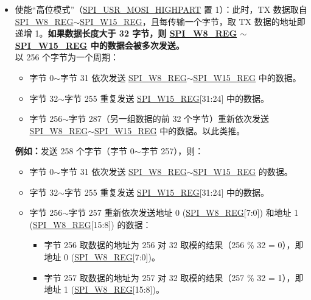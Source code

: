 \documentclass[main\_\_CN.tex]{subfiles}
\begin{document}
\begin{itemize}
\begin{itemize}
\begin{itemize}
        \end{itemize}
        \item 使能“高位模式”（\hyperref[fielddesc:SPIUSRMOSIHIGHPART]{SPI\_USR\_MOSI\_HIGHPART} 置 1）：此时，TX 数据取自 \hyperref[regdesc:SPIW8REG]{SPI\_W8\_REG}$\sim$\hyperref[regdesc:SPIW15REG]{SPI\_W15\_REG}，且每传输一个字节，取 TX 数据的地址即递增 1。\textbf{如果数据长度大于 32 字节，则 \hyperref[regdesc:SPIW8REG]{SPI\_W8\_REG} $\sim$ \hyperref[regdesc:SPIW15REG]{SPI\_W15\_REG} 中的数据会被多次发送。}\\
        以 256 个字节为一个周期：
        \begin{itemize}
            \item 字节 0$\sim$字节 31 依次发送 \hyperref[regdesc:SPIW8REG]{SPI\_W8\_REG}$\sim$\hyperref[regdesc:SPIW15REG]{SPI\_W15\_REG} 中的数据。
            \item 字节 32$\sim$字节 255 重复发送 \hyperref[regdesc:SPIW15REG]{SPI\_W15\_REG}[31:24] 中的数据。
            \item 字节 256$\sim$字节 287（另一组数据的前 32 个字节）重新依次发送 \hyperref[regdesc:SPIW8REG]{SPI\_W8\_REG}$\sim$\hyperref[regdesc:SPIW15REG]{SPI\_W15\_REG} 中的数据。以此类推。
        \end{itemize}
        \textbf{例如：}发送 258 个字节（字节 0$\sim$字节 257），则：
        \begin{itemize}
            \item 字节 0$\sim$字节 31 依次发送 \hyperref[regdesc:SPIW8REG]{SPI\_W8\_REG}$\sim$\hyperref[regdesc:SPIW15REG]{SPI\_W15\_REG} 的数据。
            \item 字节 32$\sim$字节 255 重复发送 \hyperref[regdesc:SPIW15REG]{SPI\_W15\_REG}[31:24] 中的数据。
            \item 字节 256$\sim$字节 257 重新依次发送地址 0 (\hyperref[regdesc:SPIW8REG]{SPI\_W8\_REG}[7:0]) 和地址 1 (\hyperref[regdesc:SPIW8REG]{SPI\_W8\_REG}[15:8]) 的数据：
                \begin{itemize}
                    \item 字节 256 取数据的地址为 256 对 32 取模的结果（256 \% 32 = 0），即地址 0 (\hyperref[regdesc:SPIW8REG]{SPI\_W8\_REG}[7:0])。
                    \item 字节 257 取数据的地址为 257 对 32 取模的结果（257 \% 32 = 1），即地址 1 (\hyperref[regdesc:SPIW8REG]{SPI\_W8\_REG}[15:8])。
                \end{itemize}
        \end{itemize}



\end{itemize}
\end{itemize}
\end{document}
